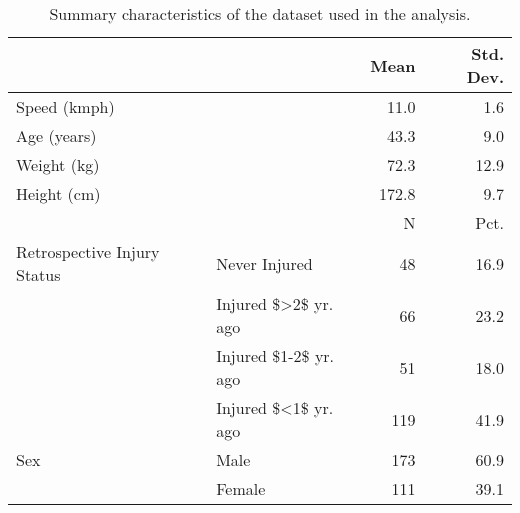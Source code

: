 \begin{table}

\caption{Summary characteristics of the dataset used in the analysis.}
\centering
\begin{tabular}[t]{llrr}
\toprule
  &    & Mean & Std. Dev.\\
\midrule
Speed (kmph) &  & 11.0 & 1.6\\
Age (years) &  & 43.3 & 9.0\\
Weight (kg) &  & 72.3 & 12.9\\
Height (cm) &  & 172.8 & 9.7\\
\midrule
 &  & N & Pct.\\
Retrospective Injury Status & Never Injured & 48 & 16.9\\
 & Injured \$>2\$ yr. ago & 66 & 23.2\\
 & Injured \$1-2\$ yr. ago & 51 & 18.0\\
 & Injured \$<1\$ yr. ago & 119 & 41.9\\
Sex & Male & 173 & 60.9\\
 & Female & 111 & 39.1\\
\bottomrule
\end{tabular}
\end{table}

